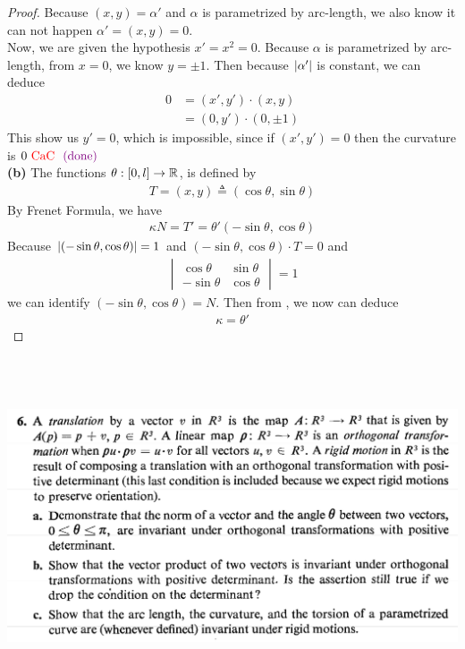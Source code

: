 \documentclass{report}
\begin{document}
\begin{proof}
Because $(x,y)=\alpha '$ and $\alpha $ is parametrized by arc-length, we also know it can not happen $\alpha '=(x,y)=0$.\\

Now, we are given the hypothesis $x'=x^2=0$. Because $\alpha$ is parametrized by arc-length, from $x=0$, we know  $y=\pm 1$.  Then because $\left|\alpha '\right|$ is constant, we can deduce
\begin{align*}
  0&=(x',y')\cdot (x,y)\\
  &=(0,y')\cdot (0,\pm 1)
\end{align*}
This show us $y'=0$, which is impossible, since if  $(x',y')=0$ then the curvature is $0\text{ \textcolor{red}{CaC} }\textcolor{violet}{\text{ (done) }}$\\

\textbf{(b)}
The functions $\theta : [0,l]\rightarrow \mathbb{R}$, is defined by  
\begin{align*}
 T= (x,y)\triangleq (\cos \theta, \sin \theta)
\end{align*}
By Frenet Formula, we have 
\begin{align}
\label{kN=}
\kappa N=T'= \theta' (- \sin \theta , \cos \theta)
\end{align}
Because $\left|(-\sin \theta, \cos \theta)\right|=1$ and $(- \sin \theta ,\cos \theta)\cdot T=0$ and  
 \begin{align*}
\begin{vmatrix} 
  \cos \theta & \sin \theta\\
  - \sin \theta & \cos \theta
\end{vmatrix}=1
\end{align*}
we can identify $(-\sin \theta, \cos \theta)=N$. Then from , we now can deduce 
\begin{align*}
\kappa =\theta' 
\end{align*}



\end{proof}
\begin{question}{}{}
\includegraphics[height=10cm,width=18cm]{hw2q1}
\end{question}
\end{document}
